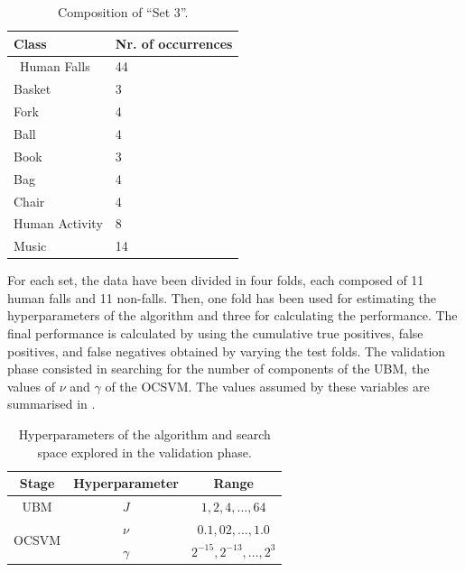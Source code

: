 \begin{table}[t]
	
	\caption{Composition  of ``Set 3''.}
	\label{tab:set3Composition}
	\begin{center}
		
		\begin{tabular}{K{3cm}K{3cm}}
			
			\hline
			\textbf{Class} & \textbf{Nr. of occurrences} \\ 

			\hline
			$\,$ Human Falls $\,$ 	& 44    		\\				
			Basket      			& 3            	\\
			Fork        			& 4            	\\
			Ball       			& 4            	\\
			Book        			& 3            	\\
			Bag         			& 4            	\\
			Chair       			& 4    			\\
			Human Activity  		& 8   			\\
			Music			  		& 14   			\\
			
			\hline
		\end{tabular}
		
	\end{center}
		
\end{table}

For each set, the data have been divided in four folds, each composed of 11 human falls and 11 non-falls. Then, one fold has been used for estimating the hyperparameters of the algorithm and three for calculating the performance. The final performance is calculated by using the cumulative true positives, false positives, and false negatives obtained by varying the test folds.
The validation phase consisted in searching for the number of components of the UBM, the values of $\nu$ and $\gamma$ of the OCSVM. The values assumed by these variables are summarised in .

\begin{table}[t]
	\centering
	\caption{Hyperparameters of the algorithm and search space explored in the validation phase.}
	\label{tab:parameter}
	\begin{tabular}{c |c | c}
		\hline
		\textbf{Stage} & \textbf{Hyperparameter} & \textbf{Range} \\
		\hline
		UBM & $J$ & $1, 2, 4, \ldots , 64$\\
		\hline
		\multirow{2}{*}{OCSVM} & $\nu$ & $0.1, 02, \ldots, 1.0$ \\
		&$\gamma$ & $2^{-15}, 2^{-13}, \ldots,2^{3} $ \\
		\hline

	\end{tabular}
\end{table}


